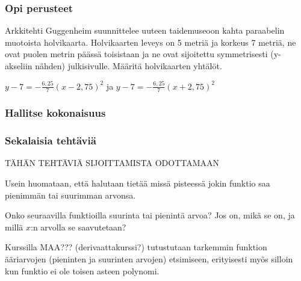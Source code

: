 \begin{tehtavasivu}

\subsubsection*{Opi perusteet}

\begin{tehtava}
Arkkitehti Guggenheim suunnittelee uuteen taidemuseoon kahta paraabelin muotoista holvikaarta. Holvikaarten leveys on 5 metriä ja korkeus 7 metriä, ne ovat puolen metrin päässä toisistaan ja ne ovat sijoitettu symmetrisesti (y-akseliin nähden) julkisivulle. Määritä holvikaarten yhtälöt.
\begin{vastaus}
$y-7 = -\frac{6,25}{7}(x - 2,75)^2$ ja $y-7 = -\frac{6,25}{7}(x + 2,75)^2$
\end{vastaus}
\end{tehtava}



\subsubsection*{Hallitse kokonaisuus}

\subsubsection*{Sekalaisia tehtäviä}

TÄHÄN TEHTÄVIÄ SIJOITTAMISTA ODOTTAMAAN

\begin{tehtava}
Usein huomataan, että halutaan tietää missä pisteessä jokin funktio saa pienimmän tai suurimman arvonsa.

Onko seuraavilla funktioilla suurinta tai pienintä arvoa? Jos on, mikä se on, ja millä $x$:n arvolla se saavutetaan?
\begin{alakohdat}
\end{alakohdat}

Kurssilla MAA??? (derivaattakurssi?) tutustutaan tarkemmin funktion ääriarvojen (pieninten ja suurinten arvojen) etsimiseen, erityisesti myös silloin kun funktio ei ole toisen asteen polynomi.
	\begin{vastaus}
	\begin{alakohdat}
	\end{alakohdat}
	\end{vastaus}
\end{tehtava}

\end{tehtavasivu}